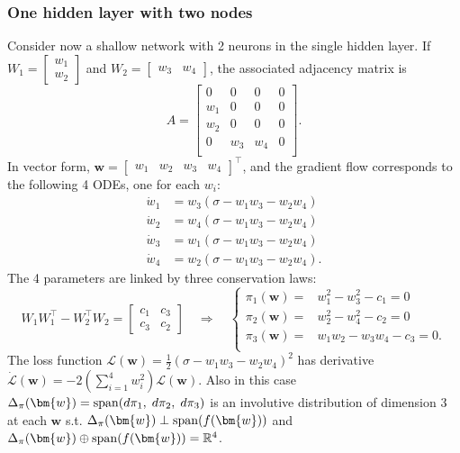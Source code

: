 \documentclass{article}
\newcommand{\1}{\mathds{1}}
\newcommand{\beq}{\begin{equation}}
\newcommand{\eeq}{\end{equation}}
\begin{document}
\subsubsection{One hidden layer with two nodes}
Consider now a shallow network with 2 neurons in the single hidden layer.
If $ W_1=\begin{bmatrix} w_1 \\ w_2 \end{bmatrix} $ and $ W_2=\begin{bmatrix} w_3 & w_4 \end{bmatrix} $, the associated adjacency matrix is 
\[
A =\begin{bmatrix}
0 & 0 & 0 & 0 \\
w_1 & 0  & 0 & 0 \\
w_2 & 0 & 0 & 0  \\
0 & w_3 & w_4 & 0  \\
\end{bmatrix} .
\]
In vector form, $ \bm{w} =\begin{bmatrix} w_1 & w_2 & w_3 & w_4 \end{bmatrix}^\top$, and the gradient flow corresponds to the following 4 ODEs, one for each $ w_i$:  
\beq
\label{eq:2-hiddennodes-sys}
\begin{split}
\dot w_1 & = w_3 ( \sigma  - w_1 w_3 - w_2 w_4 ) \\
\dot w_2 & = w_4 ( \sigma  - w_1 w_3 - w_2 w_4 ) \\
\dot w_3 & = w_1 ( \sigma  - w_1 w_3 - w_2 w_4 ) \\
\dot w_4 & = w_2 ( \sigma  - w_1 w_3 - w_2 w_4 ) .
\end{split}
\eeq
The 4 parameters are linked by three conservation laws:
\[
W_1 W_1^\top - W_2^\top W_2 =\begin{bmatrix} c_1 & c_3 \\ c_3 & c_2 \end{bmatrix} \quad \Longrightarrow \quad 
\begin{cases}
    \pi_1(\bm{w}) =  & w_1^2 - w_3^2 - c_1 =0\\
    \pi_2(\bm{w}) = & w_2^2 - w_4^2 - c_2=0 \\
    \pi_3(\bm{w}) = & w_1 w_2 - w_3 w_4 - c_3 =0 .\\
\end{cases}
\]
The loss function $ \mathcal{L}(\bm{w})=  \frac{1}{2} (\sigma  - w_1 w_3 - w_2 w_4 )^2$ has derivative $ \dot{\mathcal{L}}(\bm{w}) = - 2(\sum_{i=1}^4 w_i^2) \mathcal{L}(\bm{w}) $.
Also in this case $  \Delta_\pi (\bm{w}) = {\rm span} ( d \pi_1 ,\; d\pi_2, \; d \pi_3 ) $ is an involutive distribution of dimension 3 at each $ \bm{w}$ s.t. $  \Delta_\pi (\bm{w}) \perp {\rm span}(f(\bm{w})) $ and $  \Delta_\pi (\bm{w})\oplus {\rm span}(f(\bm{w})) = \mathbb{R}^4$.
\end{document}
